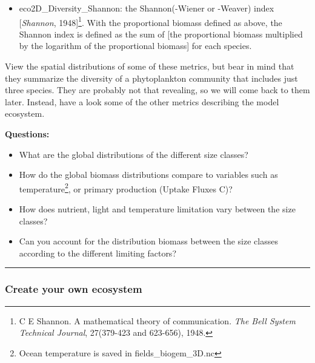 \begin{itemize}[noitemsep]
\begin{itemize}[noitemsep]
\item \textsf{\footnotesize eco2D\_Diversity\_Shannon}: the Shannon(-Wiener or -Weaver) index  [\textit{Shannon}, 1948]\footnote{C E Shannon. A mathematical theory of communication. \textit{The Bell System Technical Journal}, 27(379-423 and 623-656), 1948.}. With the proportional biomass defined as above, the Shannon index is defined as the sum of [the proportional biomass multiplied by the logarithm of the proportional biomass] for each species.
\end{itemize}
\vspace{1mm}

\end{itemize}
\vspace{1mm}

View the spatial distributions of some of these metrics, but bear in mind that they summarize the diversity of a phytoplankton community that includes just three species. They are probably not that revealing, so we will come back to them later. Instead, have a look some of the other metrics describing the model ecosystem.

\vspace{2mm}
\noindent \textbf{Questions:}
\vspace{1mm}
\begin{itemize}
\item What are the global distributions of the different size classes?
\item How do the global biomass distributions compare to variables such as temperature\footnote{Ocean temperature is saved in \textsf{\scriptsize fields\_biogem\_3D.nc}}, or primary production (\textsf{\footnotesize Uptake Fluxes C})?
\item How does nutrient, light and temperature limitation vary between the size classes?
\item Can you account for the distribution biomass between the size classes according to the different limiting factors?
\end{itemize}
\vspace{2mm}

\vspace{1mm}
\noindent\rule{4cm}{0.1mm}

\subsubsection{Create your own ecosystem}
\vspace{1mm}

